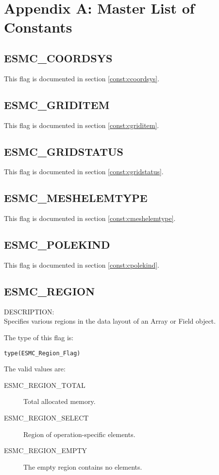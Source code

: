 
\section{Appendix A: Master List of Constants}
\label{const:cmaster}

\subsection{ESMC\_COORDSYS}
This flag is documented in section \ref{const:ccoordsys}.

\subsection{ESMC\_GRIDITEM}
This flag is documented in section \ref{const:cgriditem}.

\subsection{ESMC\_GRIDSTATUS}
This flag is documented in section \ref{const:cgridstatus}.

\subsection{ESMC\_MESHELEMTYPE}
This flag is documented in section \ref{const:cmeshelemtype}.

\subsection{ESMC\_POLEKIND}
This flag is documented in section \ref{const:cpolekind}.

\subsection{ESMC\_REGION}
\label{const:cregion}
{\sf DESCRIPTION:\\}
Specifies various regions in the data layout of an Array or Field object.

The type of this flag is:

{\tt type(ESMC\_Region\_Flag)}

The valid values are:
\begin{description}
\item [ESMC\_REGION\_TOTAL]
      Total allocated memory.
\item [ESMC\_REGION\_SELECT]
      Region of operation-specific elements.
\item [ESMC\_REGION\_EMPTY]
      The empty region contains no elements.
\end{description}

